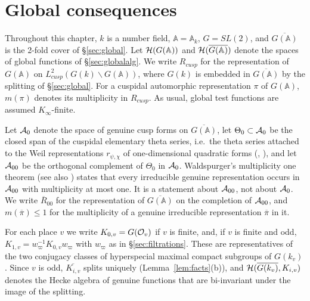 \documentclass[12pt,letterpaper,openany]{book}
\theoremstyle{plain}
\theoremstyle{definition}
\theoremstyle{remark}
\theoremstyle{remark}
\begin{document}
\chapter{Global consequences}\label{ch:global}

Throughout this chapter, $k$ is a number field, ${\mathbb{A}}={\mathbb{A}}_k$,
$G=SL(2)$, and $\overline{G({\mathbb{A}})}$ is the 2-fold cover of
\S\ref{sec:global}. Let ${\cal H}(G({\mathbb{A}}))$ and
${\cal H}(\overline{G({\mathbb{A}})})$ denote the spaces of global
functions of \S\ref{sec:globalalg}. We write $R_{cusp}$ for the
representation of $G({\mathbb{A}})$ on
$L^2_{cusp}(G(k)\backslash G({\mathbb{A}}))$, where $G(k)$ is
embedded in $\overline{G({\mathbb{A}})}$ by the splitting of
\S\ref{sec:global}. For a cuspidal automorphic representation $\pi$ of
$G({\mathbb{A}})$, $m(\pi)$ denotes its multiplicity in $R_{cusp}$.
As usual, global test functions are assumed $K_\infty$-finite.

Let ${\cal A}_0$ denote the space of genuine cusp forms on
$\overline{G({\mathbb{A}})}$, let $\Theta_0\subset{\cal A}_0$ be the closed
span of the cuspidal elementary theta series, i.e.\ the theta series
attached to the Weil representations $r_{\psi,\chi}$ of one-dimensional
quadratic forms (\cite{GePS}, \cite{Ge2}), and let ${\cal A}_{00}$ be the
orthogonal complement of $\Theta_0$ in ${\cal A}_0$. Waldspurger's
multiplicity one theorem \cite{Wa1} (see also \cite{PS}) states that every
irreducible genuine representation occurs in ${\cal A}_{00}$ with
multiplicity at most one. It is a statement about ${\cal A}_{00}$, not about
${\cal A}_0$. We write $\overline{R}_{00}$ for the representation of
$\overline{G({\mathbb{A}})}$ on the completion of ${\cal A}_{00}$, and
$m(\overline{\pi})\leq1$ for the multiplicity of a genuine irreducible
representation $\overline\pi$ in it.

For each place $v$ we write $K_{0,v}=G({\cal O}_v)$ if $v$ is finite,
and, if $v$ is finite and odd, $K_{1,v}=w_\varpi^{-1}K_{0,v}w_\varpi$ with
$w_\varpi$ as in \S\ref{sec:filtrations}. These are representatives of the
two conjugacy classes of hyperspecial maximal compact subgroups of
$G(k_v)$. Since $v$ is odd, $\overline{K_{i,v}}$ splits uniquely
(Lemma~\ref{lem:facts}(b)), and ${\cal H}(\overline{G(k_v)},K_{i,v})$
denotes the Hecke algebra of genuine functions that are bi-invariant under
the image of the splitting.
\end{document}

